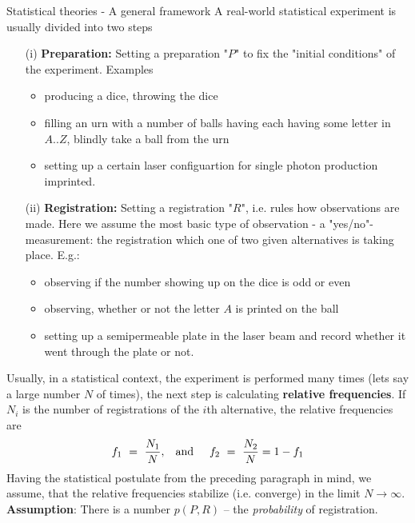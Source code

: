 \begin{section}{Statistical theories - A general framework}
A real-world statistical experiment is usually divided into two steps
\begin{enumerate}
 \item[(i)] \textbf{Preparation:} Setting a preparation "$P$" to fix the "initial conditions" of the experiment. Examples 
 \begin{itemize}
 \item producing a dice, throwing the dice
 \item filling an urn with a number of balls having each having some letter in $A..Z$, blindly take a ball from the urn
 \item setting up a certain laser configuartion for single photon production
 imprinted.
 \end{itemize} 
  \item[(ii)] \textbf{Registration:} Setting a registration "$R$", i.e. rules how observations are made. Here we assume the most basic type of observation - a "yes/no"-measurement: the registration which one of two given alternatives is taking place. E.g.: 
   \begin{itemize}
   	\item observing if the number showing up on the dice is odd or even
   	\item observing, whether or not the letter $A$ is printed on the ball
   	\item setting up a semipermeable plate in the laser beam and record whether it went through the plate or not.
   \end{itemize}
\end{enumerate}
Usually, in a statistical context, the experiment is performed many times (lets say a large number $N$ of times), the next step is calculating \textbf{relative frequencies}. If $N_i$ is the number of registrations of the $i$th alternative, the relative frequencies are
	\begin{align*}
	f_1 \ = \ \frac{N_1}{N}, \hspace{.3cm}\text{and} \hspace{.5cm} f_2 \ = \ \frac{N_2}{N} = 1 - f_1
	\end{align*}
Having the statistical postulate from the preceding paragraph in mind, we assume, that the relative frequencies stabilize (i.e. converge) in the limit $N \rightarrow \infty$.\newline  
\textbf{Assumption}: There is a number $p(P,R)$ -- the \emph{probability} of registration. 

\end{section}
